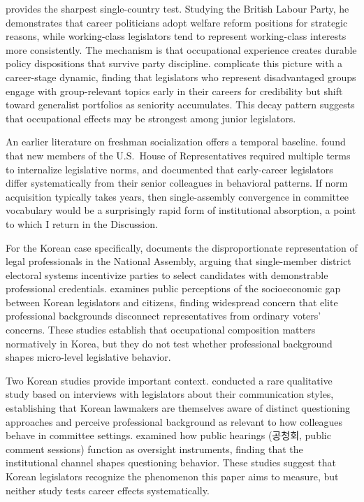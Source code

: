 \documentclass[11pt]{article}
\begin{document}
\citet{ogrady2018} provides the sharpest single-country test. Studying the British Labour Party, he demonstrates that career politicians adopt welfare reform positions for strategic reasons, while working-class legislators tend to represent working-class interests more consistently. The mechanism is that occupational experience creates durable policy dispositions that survive party discipline. \citet{bailer2021} complicate this picture with a career-stage dynamic, finding that legislators who represent disadvantaged groups engage with group-relevant topics early in their careers for credibility but shift toward generalist portfolios as seniority accumulates. This decay pattern suggests that occupational effects may be strongest among junior legislators.

An earlier literature on freshman socialization offers a temporal baseline. \citet{asher1973} found that new members of the U.S.\ House of Representatives required multiple terms to internalize legislative norms, and \citet{crook1985} documented that early-career legislators differ systematically from their senior colleagues in behavioral patterns. If norm acquisition typically takes years, then single-assembly convergence in committee vocabulary would be a surprisingly rapid form of institutional absorption, a point to which I return in the Discussion.

For the Korean case specifically, \citet{joshi2019} documents the disproportionate representation of legal professionals in the National Assembly, arguing that single-member district electoral systems incentivize parties to select candidates with demonstrable professional credentials. \citet{han2024} examines public perceptions of the socioeconomic gap between Korean legislators and citizens, finding widespread concern that elite professional backgrounds disconnect representatives from ordinary voters' concerns. These studies establish that occupational composition matters normatively in Korea, but they do not test whether professional background shapes micro-level legislative behavior.

Two Korean studies provide important context. \citet{kim2013} conducted a rare qualitative study based on interviews with legislators about their communication styles, establishing that Korean lawmakers are themselves aware of distinct questioning approaches and perceive professional background as relevant to how colleagues behave in committee settings. \citet{kim2019} examined how public hearings (공청회, public comment sessions) function as oversight instruments, finding that the institutional channel shapes questioning behavior. These studies suggest that Korean legislators recognize the phenomenon this paper aims to measure, but neither study tests career effects systematically.
\end{document}
